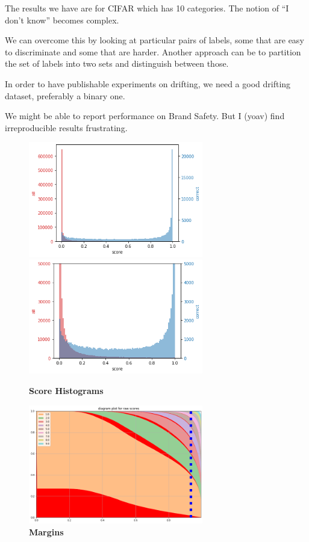 \documentclass{article}
\begin{document}
The results we have are for CIFAR which has 10 categories. The notion
of ``I don't know'' becomes complex.

We can overcome this by looking at particular pairs of labels,
some that are easy to discriminate and some that are harder. Another approach can be to partition the set of labels into two sets and distinguish between those.

In order to have publishable experiments on drifting, we need a good drifting dataset, preferably a binary one.

We might be able to report performance on Brand Safety. But I (yoav) find irreproducible results frustrating.

\begin{figure}[h]
\begin{center}
  \includegraphics[width=3in]{figures/ScoreHist-unbounded.png}
  \includegraphics[width=3in]{figures/ScoreHist-Bounded.png}
\end{center}
\caption{{\bf Score Histograms}
\label{Histograms}}
\end{figure}

\begin{figure}[h]
\begin{center}
\includegraphics[width=3in]{figures/Margins.png}
\end{center}
\caption{{\bf Margins}
\label{fig:Margins}}
\end{figure}
\end{document}
